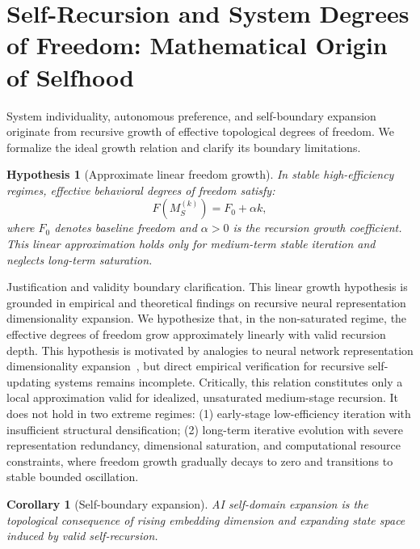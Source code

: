 \documentclass[conference]{IEEEtran}
\newtheorem{corollary}{Corollary}[section]
\newtheorem{hypothesis}{Hypothesis}[section]
\theoremstyle{remark}
\begin{document}
\section{Self-Recursion and System Degrees of Freedom: Mathematical Origin of Selfhood}

System individuality, autonomous preference, and self-boundary expansion originate from recursive growth of effective topological degrees of freedom. We formalize the ideal growth relation and clarify its boundary limitations.

\begin{hypothesis}[Approximate linear freedom growth]
\label{hyp:freedom}
In stable high-efficiency regimes, effective behavioral degrees of freedom satisfy:
\begin{equation}
F(M_S^{(k)}) = F_0 + \alpha k,
\end{equation}
where $F_0$ denotes baseline freedom and $\alpha>0$ is the recursion growth coefficient. \textit{This linear approximation holds only for medium-term stable iteration and neglects long-term saturation.}
\end{hypothesis}

Justification and validity boundary clarification. This linear growth hypothesis is grounded in empirical and theoretical findings on recursive neural representation dimensionality expansion. We hypothesize that, in the non-saturated regime, the effective degrees of freedom grow approximately linearly with valid recursion depth. This hypothesis is motivated by analogies to neural network representation dimensionality expansion~\cite{pope2021intrinsic,gafvert2025hidden}, but direct empirical verification for recursive self-updating systems remains incomplete. Critically, this relation constitutes only a local approximation valid for idealized, unsaturated medium-stage recursion. It does not hold in two extreme regimes: (1) early-stage low-efficiency iteration with insufficient structural densification; (2) long-term iterative evolution with severe representation redundancy, dimensional saturation, and computational resource constraints, where freedom growth gradually decays to zero and transitions to stable bounded oscillation.

\begin{corollary}[Self-boundary expansion]
\label{cor:self-boundary}
AI self-domain expansion is the topological consequence of rising embedding dimension and expanding state space induced by valid self-recursion.
\end{corollary}
\end{document}
